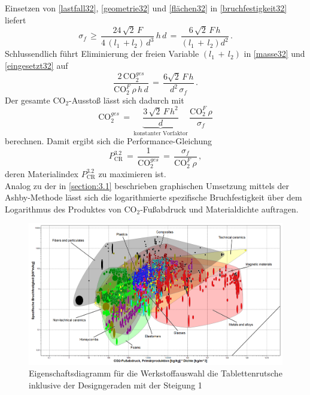 Einsetzen von \ref{lastfall32}, \ref{geometrie32} und \ref{flächen32} in \ref{bruchfestigkeit32} liefert
\begin{equation}\label{eingesetzt32}
\sigma_f\,\ge\,\frac{24\,\sqrt{2}\,F}{4\,(l_1\,+l_2)\,d^3}\,h\,d\,=\,\frac{6\,\sqrt{2}\,F\,h}{(l_1\,+\,l_2)d^2}\,.
\end{equation}
Schlussendlich führt Eliminierung der freien Variable $(l_1\,+\,l_2)$ in \ref{masse32} und \ref{eingesetzt32} auf
\begin{equation}
\frac{2\,\text{CO}_2^{ges}}{\text{CO}_2^F\,\rho\,h\,d}\,=\,\frac{6\sqrt{2}\,F\,h}{d^2\,\sigma_f}\,.
\end{equation}
Der gesamte CO$_2$-Ausstoß lässt sich dadurch mit
\begin{equation}
\text{CO}_2^{ges}\,=\,\underbrace{\frac{3\,\sqrt{2}\,F\,h^2}{d}}_{\text{konstanter Vorfaktor}}\,\frac{\text{CO}_2^F\,\rho}{\sigma_f}
\end{equation}
berechnen.
Damit ergibt sich die Performance-Gleichung
\begin{equation} \label{zielfkt32}
P_{\text{CR}}^{3.2}\,=\,\frac{1}{\text{CO}_2^{ges}}\,=\,\frac{\sigma_f}{\text{CO}_2^F\,\rho}\,,
\end{equation}
deren Materialindex $P_{\text{CR}}^{3.2}$ zu maximieren ist.\\
Analog zu der in \ref{section:3.1} beschrieben graphischen Umsetzung mittels der Ashby-Methode lässt sich die logarithmierte spezifische Bruchfestigkeit über dem Logarithmus des Produktes von CO$_2$-Fußabdruck und Materialdichte auftragen.\\
\begin{figure}[H]
	\centering
	\includegraphics[width=1.0\linewidth]{chapter/Bilder/3_2_1}
	\caption{Eigenschaftsdiagramm für die Werkstoffauswahl die Tablettenrutsche inklusive der Designgeraden mit der Steigung 1}
	\label{fig:ces_3_2_1}
\end{figure}
